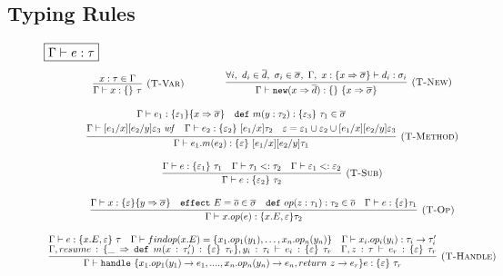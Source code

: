 \documentclass{article}
\newcommand{\keywadj}[1]{\mathtt{#1}}
\newcommand{\keyw}[1]{\keywadj{#1}~}
\begin{document}
\subsection{Typing Rules}
\begin{figure}[H]
\footnotesize{
\noindent$\fbox{$\Gamma \vdash e : \tau$}$
\[
\begin{array}{c}


\infer[\textsc{(T-Var)}]
  {\Gamma \vdash x : \{ \}~\tau}
  {x : \tau \in \Gamma} \quad \quad
~~~~~~~
\infer[\textsc{(T-New)}]
	{\Gamma \vdash \keywadj{new} (x \Rightarrow \overline{d}) : \{ \}~\{ x \Rightarrow \overline{\sigma} \}}
	{\forall i,~d_i \in \overline{d},~\sigma_i \in \overline{\sigma},~\Gamma,~x : \{ x \Rightarrow \overline{\sigma} \} \vdash d_i : \sigma_i}\\[3ex]
\infer[\textsc{(T-Method)}]
  {\Gamma \vdash e_1.m(e_2) : \{ \varepsilon \}~[e_1/x][e_2/y]\tau_1}
  {\begin{gathered} \Gamma \vdash e_1 : \{ \varepsilon_1 \} \{ x \Rightarrow \overline{\sigma} \}\quad \keyw{def} m(y : \tau_2) : \{ \varepsilon_3 \}~\tau_1 \in \overline{\sigma}\\
  \Gamma \vdash [e_1/x][e_2/y]\varepsilon_3~\mathit{wf}\quad \Gamma \vdash e_2 : \{ \varepsilon_2 \}~[e_1/x]\tau_2 \quad \varepsilon = \varepsilon_1 \cup \varepsilon_2 \cup [e_1/x][e_2/y]\varepsilon_3 \end{gathered}}\\[3ex]

\infer[\textsc{(T-Sub)}]
  {\Gamma \vdash e : \{ \varepsilon_2 \}~\tau_2}
  {\Gamma \vdash e : \{ \varepsilon_1 \}~\tau_1 & \Gamma \vdash \tau_1 <: \tau_2 & \Gamma \vdash \varepsilon_1 <: \varepsilon_2} \\[3ex]

\infer[\textsc{(T-Op)}]
  {\Gamma \vdash x.op(e): \{x.E, \varepsilon\} \tau_2 }
  {\Gamma \vdash x: \{\varepsilon\} \{y \Rightarrow \overline{\sigma}\} \quad
   \keyw{effect} E = \overline{o} \in \overline{\sigma} \quad 
   \keyw{def} op(z: \tau_1): \tau_2 \in \overline{o} \quad 
   \Gamma \vdash e: \{\varepsilon \} \tau_1
  }
  \\[3ex]
  
  \infer[\textsc{(T-Handle)}]
  {\Gamma \vdash \keyw{handle} \{x_1.op_1(y_1)\rightarrow e_1, ...., x_n.op_n(y_n)\rightarrow e_n, return\ z\rightarrow e_r\} e: \{\varepsilon\}\ \tau_r }
  {\Gamma \vdash e: \{x.E, \varepsilon\}\ \tau \quad 
  \Gamma \vdash findop(x.E) = \{x_1.op_1(y_1), \dots, x_n.op_n(y_n)\} \quad
   \Gamma \vdash x_i.op_i(y_i) : \tau_i \rightarrow \tau_i'\\  
   \Gamma, resume: \{\_ \Rightarrow \keyw{def} m(x: \tau_i') : \{\varepsilon\}\ \tau_r\} , y_i:\tau_i \vdash e_i: \{\varepsilon\}\ \tau_r \quad \Gamma, z:\tau \vdash e_r: \{\varepsilon\}\ \tau_r
  }\\[3ex]
\end{array}
\]

}
\end{figure}
\end{document}

